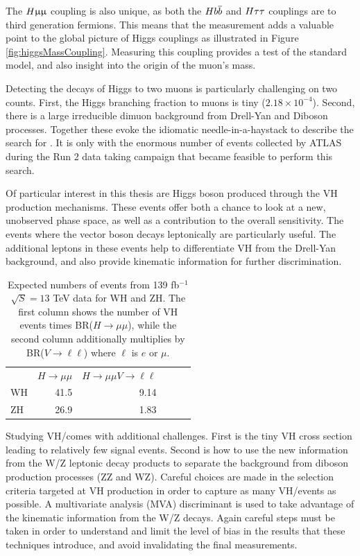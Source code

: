 The $H\upmu\upmu$ coupling is also unique, as both the $Hb\overline{b}$ and $H\tau\tau$ couplings are to third generation fermions.
This means that the \hmm measurement adds a valuable point to the global picture of Higgs couplings as illustrated in Figure \ref{fig:higgsMassCoupling}.
Measuring this coupling provides a test of the standard model, and also insight into the origin of the muon's mass.

Detecting the decays of Higgs to two muons is particularly challenging on two counts.
First, the Higgs branching fraction to muons is tiny ($2.18\times10^{-4}$).
Second, there is a large irreducible dimuon background from Drell-Yan and Diboson processes.
Together these evoke the idiomatic needle-in-a-haystack to describe the search for \hmm.
It is only with the enormous number of events collected by ATLAS during the Run 2 data taking campaign that became feasible to perform this search.


Of particular interest in this thesis are Higgs boson produced through the VH production mechanisms.
These events offer both a chance to look at a new, unobserved phase space, as well as a contribution to the overall \hmm sensitivity.
The events where the vector boson decays leptonically are particularly useful.
The additional leptons in these events help to differentiate VH from the Drell-Yan background, and also provide kinematic information for further discrimination.

\begin{table}[htbp]
 \begin{center}
\begin{tabular}{l r r r r r}\toprule
   & $H\to\mu\mu$ & $H\to\mu\mu V\to\ell\ell$ \\
WH & 41.5 & 9.14 \\
ZH & 26.9 & 1.83 \\
\bottomrule\end{tabular}
 \end{center}
 \caption{Expected numbers of events from 139 fb$^{-1}$ $\sqrt{S}=13$ TeV data for WH and ZH. The first column shows the number of VH events times BR($H\to\mu\mu$), while the second column additionally multiplies by BR($V\to\ell\ell$) where $\ell$ is $e$ or $\mu$.}
\label{tab:vh-predict}
\end{table}

Studying VH/\hmm comes with additional challenges.
First is the tiny VH cross section leading to relatively few signal events.
Second is how to use the new information from the W/Z leptonic decay products to separate the background from diboson production processes (ZZ and WZ).
Careful choices are made in the selection criteria targeted at VH production in order to capture as many VH/\hmm events as possible.
A multivariate analysis (MVA) discriminant is used to take advantage of the kinematic information from the W/Z decays.
Again careful steps must be taken in order to understand and limit the level of bias in the results that these techniques introduce, and avoid invalidating the final measurements.


